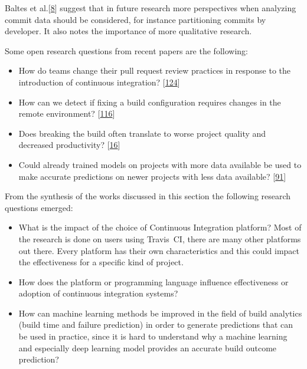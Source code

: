 \documentclass[]{book}
\providecommand{\tightlist}{%
  \setlength{\itemsep}{0pt}\setlength{\parskip}{0pt}}
\begin{document}
Baltes et al.{[}\protect\hyperlink{ref-baltes2018no}{8}{]} suggest that
in future research more perspectives when analyzing commit data should
be considered, for instance partitioning commits by developer. It also
notes the importance of more qualitative research.

Some open research questions from recent papers are the following:

\begin{itemize}
\tightlist
\item
  How do teams change their pull request review practices in response to
  the introduction of continuous integration?
  {[}\protect\hyperlink{ref-zhao2017impact}{124}{]}
\item
  How can we detect if fixing a build configuration requires changes in
  the remote environment?
  {[}\protect\hyperlink{ref-vassallo2018break}{116}{]}
\item
  Does breaking the build often translate to worse project quality and
  decreased productivity?
  {[}\protect\hyperlink{ref-beller2017oops}{16}{]}
\item
  Could already trained models on projects with more data available be
  used to make accurate predictions on newer projects with less data
  available? {[}\protect\hyperlink{ref-ni2018acona}{91}{]}
\end{itemize}

From the synthesis of the works discussed in this section the following
research questions emerged:

\begin{itemize}
\tightlist
\item
  What is the impact of the choice of Continuous Integration platform?
  Most of the research is done on users using Travis~CI, there are many
  other platforms out there. Every platform has their own
  characteristics and this could impact the effectiveness for a specific
  kind of project.
\item
  How does the platform or programming language influence effectiveness
  or adoption of continuous integration systems?
\item
  How can machine learning methods be improved in the field of build
  analytics (build time and failure prediction) in order to generate
  predictions that can be used in practice, since it is hard to
  understand why a machine learning and especially deep learning model
  provides an accurate build outcome prediction?
\end{itemize}
\end{document}
